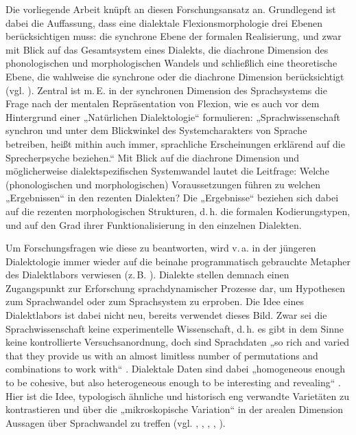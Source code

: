 Die vorliegende Arbeit knüpft an diesen Forschungsansatz an. Grundlegend ist dabei die Auffassung, dass eine dialektale Flexionsmorphologie drei Ebenen berücksichtigen muss: die synchrone Ebene der formalen Realisierung, und zwar mit Blick auf das Gesamtsystem eines Dialekts, die diachrone Dimension des phonologischen und morphologischen Wandels und schließlich eine theoretische Ebene, die wahlweise die synchrone oder die diachrone Dimension berücksichtigt (vgl. \citealt[383]{Harnisch2000}). Zentral ist m.\,E. in der synchronen Dimension des Sprachsystems die Frage nach der mentalen Repräsentation von Flexion, wie es auch \citet[175]{HarnischRowley1990} vor dem Hintergrund einer „Natürlichen Dialektologie“ formulieren: „Sprachwissenschaft synchron und unter dem Blickwinkel des Systemcharakters von Sprache betreiben, heißt mithin auch immer, sprachliche Erscheinungen erklärend auf die Sprecherpsyche beziehen.“ Mit Blick auf die diachrone Dimension und möglicherweise dialektspezifischen Sys\-temwandel lautet die Leitfrage: Welche (phonologischen und morphologischen) Voraussetzungen führen zu welchen „Ergebnissen“ in den rezenten Dialekten? Die „Ergebnisse“ beziehen sich dabei auf die rezenten morphologischen Strukturen, d.\,h. die formalen Kodierungstypen, und auf den Grad ihrer Funktionalisierung in den einzelnen Dialekten.

Um Forschungsfragen wie diese zu beantworten, wird v.\,a. in der jüngeren Dialektologie immer wieder auf die beinahe programmatisch gebrauchte Metapher des Dialektlabors verwiesen (z.\,B. \citealt{deVogelaerSeiler2012,HarnischRowley1990,SchmidtHerrgen2011}). Dialekte stellen demnach einen Zugangspunkt zur Erforschung sprachdynamischer Prozesse dar, um Hypothesen zum Sprachwandel oder zum Sprachsystem zu erproben. Die Idee eines Dialektlabors ist dabei nicht neu, bereits \citet{Moulton1962} verwendet dieses Bild. Zwar sei die Sprachwissenschaft keine experimentelle Wissenschaft, d.\,h. es gibt in dem Sinne keine kontrollierte Versuchsanordnung, doch sind Sprachdaten „so rich and varied that they provide us with an almost limitless number of permutations and combinations to work with“ \citep[460]{Moulton1962}. Dialektale Daten sind dabei „homogeneous enough to be cohesive, but also heterogeneous enough to be interesting and revealing“ \citep[460--461]{Moulton1962}. Hier ist die Idee, typologisch ähnliche und historisch eng verwandte Varietäten zu kontrastieren und über die „mikroskopische Variation“ \citep[185]{Seiler2008} in der arealen Dimension Aussagen über Sprachwandel zu treffen (vgl. \citealt[13]{Bisang2004}, \citealt[5--6]{SchallertDammel2019}, \citealt[1--2]{deVogelaerSeiler2012}, \citealt[816--817]{Rabanus2010}, \citealt[38]{SchmidtEtAl2019}).

